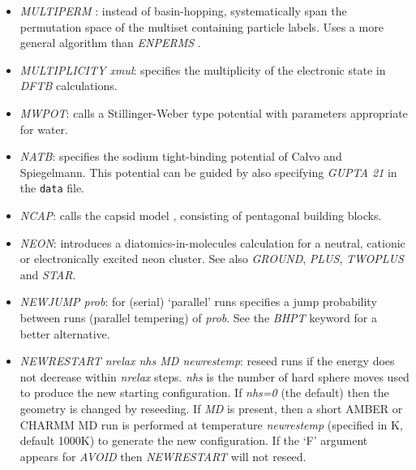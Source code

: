\documentclass[12pt,a4paper,dvips]{article}
\begin{document}
\begin{itemize}
\item {\it MULTIPERM \/}: instead of basin-hopping, systematically span the permutation space of the multiset containing particle labels. Uses a more general algorithm than {\it ENPERMS \/}.

\item {\it MULTIPLICITY xmul\/}: specifies the multiplicity of the electronic state in {\it DFTB\/}
calculations.

\item {\it MWPOT}: calls a Stillinger-Weber type potential with parameters appropriate for water\cite{MolineroM09}.

\item {\it NATB}: specifies the sodium tight-binding potential of Calvo and Spiegelmann.
This potential can be guided by also specifying {\it GUPTA 21} in the {\tt data} file.

\item {\it NCAP\/}: calls the capsid model \cite{Wales05}, consisting of pentagonal building blocks.

\item {\it NEON\/}: introduces a diatomics-in-molecules calculation for
a neutral, cationic or electronically excited neon cluster. See also
{\it GROUND\/}, {\it PLUS\/}, {\it TWOPLUS\/} and {\it STAR\/}.

\item {\it NEWJUMP prob\/}: for (serial)
`parallel' runs specifies a jump probability between runs 
(parallel tempering) of {\it prob\/}.
See the {\it BHPT\/} keyword for a better alternative.

\item {\it NEWRESTART nrelax nhs MD newrestemp\/}: reseed runs if the energy does not decrease within {\it nrelax} steps.
{\it nhs} is the number of hard sphere moves used to produce the new starting configuration.
If {\it nhs=0} (the default) then the geometry is changed by reseeding. If {\it MD} is present, then a short AMBER or CHARMM MD run is performed at temperature {\it newrestemp} (specified in K, default 1000K) to generate the new configuration.
If the `F' argument appears for {\it AVOID\/} then
{\it NEWRESTART\/} will not reseed.




\end{itemize}
\end{document}
